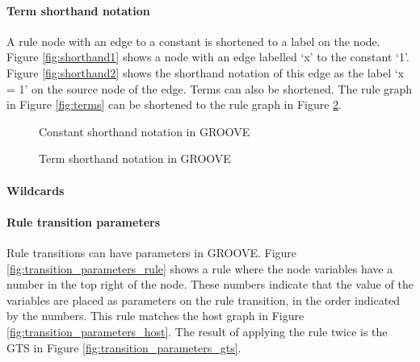 \paragraph*{Term shorthand notation}
A rule node with an edge to a constant is shortened to a label on the node. Figure \ref{fig:shorthand1} shows a node with an edge labelled `x' to the constant `1'. Figure \ref{fig:shorthand2} shows the shorthand notation of this edge as the label `x = 1' on the source node of the edge. Terms can also be shortened. The rule graph in Figure \ref{fig:terms} can be shortened to the rule graph in Figure \ref{fig:term_shorthand}.

\begin{figure}[h]
  \begin{center}
    \hspace{20px}
  \end{center}
  \caption{Constant shorthand notation in GROOVE}
  \label{fig:shorthand}
\end{figure}

\begin{figure}[h]
  \begin{center}
    
  \end{center}
  \caption{Term shorthand notation in GROOVE}
  \label{fig:term_shorthand}
\end{figure}

\paragraph*{Wildcards}

\paragraph*{Rule transition parameters}
Rule transitions can have parameters in GROOVE. Figure \ref{fig:transition_parameters_rule} shows a rule where the node variables have a number in the top right of the node. These numbers indicate that the value of the variables are placed as parameters on the rule transition, in the order indicated by the numbers. This rule matches the host graph in Figure \ref{fig:transition_parameters_host}. The result of applying the rule twice is the GTS in Figure \ref{fig:transition_parameters_gts}.


